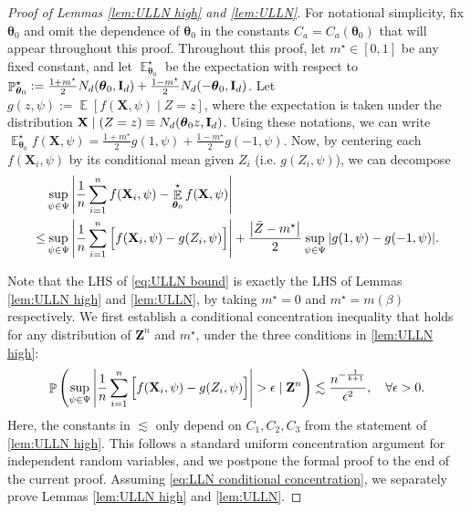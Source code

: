 \documentclass[preprint,reqno]{imsart}
\newcommand{\ttheta}{\boldsymbol{\theta}}
\newcommand{\I}{\mathbf{I}_{\mathnormal{d}}}
\DeclareMathOperator{\EE}{\mathbb{E}}
\DeclareMathOperator{\PP}{\mathbb{P}}
\newcommand{\Z}{\mathbf{Z}}
\newcommand{\X}{\mathbf{X}}
\DeclareMathOperator{\sumin}{\sum_{\mathnormal i=1}^{\mathnormal n}}
\begin{document}
\begin{appendix}
\begin{proof}[Proof of Lemmas \ref{lem:ULLN high} and \ref{lem:ULLN}]
For notational simplicity, fix $\ttheta_0$ and omit the dependence of $\ttheta_0$ in the constants $C_a = C_a(\ttheta_0)$ that will appear throughout this proof.
Throughout this proof, let $m^\star \in [0,1]$ be any fixed constant, and let $\EE_{\ttheta_0}^\star$ be the expectation with respect to $\PP_{\ttheta_0}^\star := \frac{1+m^\star}{2} N_d(\ttheta_0, \I) + \frac{1-m^\star}{2} N_d(-\ttheta_0, \I)$.
Let $g(z, \psi) := \EE [f(\X, \psi) \mid Z = z]$, where the expectation is taken under the distribution $\X \mid (Z=z) \equiv N_d(\ttheta_0 z, \I)$. Using these notations, we can write $\EE_{\ttheta_0}^\star f(\X, \psi) = \frac{1+m^\star}{2}g(1,\psi) + \frac{1-m^\star}{2} g(-1, \psi).$ 
Now, by centering each $f(\X_i, \psi)$ by its conditional mean given $Z_i$ (i.e. $g(Z_i, \psi)$), we can decompose 
    \begin{equation}\label{eq:ULLN bound}
    \begin{aligned}
        &\sup_{\psi \in \Psi} \left| \frac{1}{n} \sumin f(\X_i, \psi) - \EE_{\ttheta_0}^\star f(\X, \psi) \right| \\
        \le & \sup_{\psi \in \Psi} \left| \frac{1}{n} \sumin \Big[ f(\X_i, \psi) - g(Z_i, \psi) \Big] \right| + \frac{\left|\bar{Z} - m^\star \right|}{2} \sup_{\psi \in \Psi} 
         |g(1,\psi) - g(-1, \psi)|.
    \end{aligned}
    \end{equation}

Note that the LHS of \eqref{eq:ULLN bound} is exactly the LHS of Lemmas \ref{lem:ULLN high} and \ref{lem:ULLN}, by taking $m^\star = 0$ and $m^\star = m(\beta)$ respectively. 
We first establish a conditional concentration inequality that holds for any distribution of $\Z^n$ and $m^\star$, under the three conditions in \cref{lem:ULLN high}:
\begin{align}\label{eq:LLN conditional concentration}
    \PP \left(\sup_{\psi \in \Psi} \left| \frac{1}{n} \sumin \Big[f(\X_i, \psi) - g(Z_i, \psi)\Big] \right| > \epsilon \mid \Z^n \right) \lesssim \frac{n^{-\frac{1}{k+1}}}{\epsilon^2}, \quad \forall \epsilon > 0.
\end{align}
Here, the constants in $\lesssim$ only depend on $C_1, C_2, C_3$ from the statement of \cref{lem:ULLN high}.
This follows a standard uniform concentration argument for independent random variables, and we postpone the formal proof to the end of the current proof. Assuming \eqref{eq:LLN conditional concentration}, we separately prove Lemmas \ref{lem:ULLN high} and \ref{lem:ULLN}.
\vspace{2mm}


\end{proof}
\end{appendix}
\end{document}
